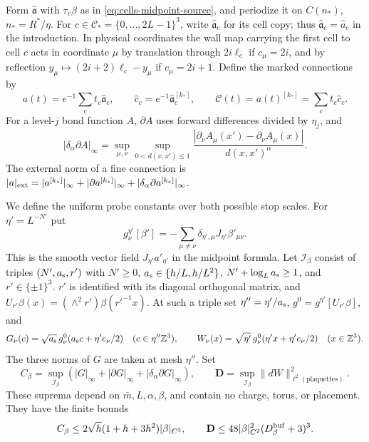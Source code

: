 Form $\widehat{\mathfrak a}$ with $\tau_v\beta$
as in \eqref{eq:cells-midpoint-source}, and
periodize it on $C(n_*)$, $n_*=R^*/\eta$.
For $c\in\mathcal C_*=\{0,\ldots,2L-1\}^3$,
write $\widehat{\mathfrak a}_c$ for its
cell copy; thus $\widehat{\mathfrak a}_c=\widehat a_c$ in the
introduction. In physical coordinates the
wall map carrying the first cell to cell $c$
acts in coordinate $\mu$ by translation through
$2i\ell_c$ if $c_\mu=2i$, and by reflection
$y_\mu\mapsto(2i+2)\ell_c-y_\mu$ if $c_\mu=2i+1$.
Define the marked connections by
\begin{equation}\label{eq:interacting-marked-connections}
 a(t)=e^{-1}\sum_ct_c\widehat{\mathfrak a}_c,\qquad
 \widehat c_c=e^{-1}\widehat{\mathfrak a}_c^{[k_*]},\qquad
 \mathscr C(t)=a(t)^{[k_*]}=\sum_ct_c\widehat c_c .
\end{equation}
For a level-$j$ bond function $A$, $\partial A$
uses forward differences divided by $\eta_j$,
and
\[
 |\delta_\alpha\partial A|_\infty
  =\sup_{\mu,\nu}\sup_{0<d(x,x')\le1}
     \frac{|\partial_\nu A_\mu(x')-\partial_\nu A_\mu(x)|}
          {d(x,x')^\alpha}.
\]
The external norm of a fine connection is
$|a|_{\rm ext}=|a^{[k_*]}|_\infty+
|\partial a^{[k_*]}|_\infty+
|\delta_\alpha\partial a^{[k_*]}|_\infty$.

We define the uniform probe constants over both
possible stop scales. For $\eta'=L^{-N'}$ put
\[
 g_\nu^{\eta'}[\beta']
      =-\sum_{\mu\ne\nu}\delta_{\eta',\mu}J_{\eta'}\beta'_{\mu\nu}.
\]
This is the smooth vector field
$J_{\eta'}a'_{\eta'}$ in the midpoint formula.
Let $\mathcal I_\beta$ consist of triples
$(N',a_{\rm s},r')$ with
$N'\ge0$, $a_{\rm s}\in\{h/L,h/L^2\}$,
$N'+\log_La_{\rm s}\ge1$, and
$r'\in\{\pm1\}^3$.
$r'$ is identified with its diagonal orthogonal
matrix, and $U_{r'}\beta(x)=(\wedge^2r')\beta(r'^{-1}x)$.
At such a triple set $\eta''=\eta'/a_{\rm s}$,
$g^0=g^{\eta'}[U_{r'}\beta]$, and
\[
 G_\nu(c)=\sqrt{a_{\rm s}}\,
                  g_\nu^0(a_{\rm s}c+\eta'e_\nu/2)
                       \quad(c\in\eta''\mathbb Z^3),\qquad
 W_\nu(x)=\sqrt{\eta'}\,g_\nu^0(\eta'x+\eta'e_\nu/2)
                       \quad(x\in\mathbb Z^3).
\]
The three norms of $G$ are taken at mesh $\eta''$.
Set
\begin{equation}\label{eq:interacting-uniform-probe-constants}
 C_\beta=\sup_{\mathcal I_\beta}
              (|G|_\infty+|\partial G|_\infty+
                                    |\delta_\alpha\partial G|_\infty),
 \qquad
 \mathbf D=\sup_{\mathcal I_\beta}\|dW\|_{\ell^2(\text{plaquettes})}^2.
\end{equation}
These suprema depend on $\bar m,L,\alpha,\beta$,
and contain no charge, torus, or placement.
They have the finite bounds
\begin{equation}\label{eq:interacting-uniform-probe-finite}
 C_\beta\le2\sqrt h(1+h+3h^2)|\beta|_{C^3},
 \qquad
 \mathbf D\le48|\beta|_{C^2}^2(D_\beta^{\rm buf}+3)^3 .
\end{equation}

